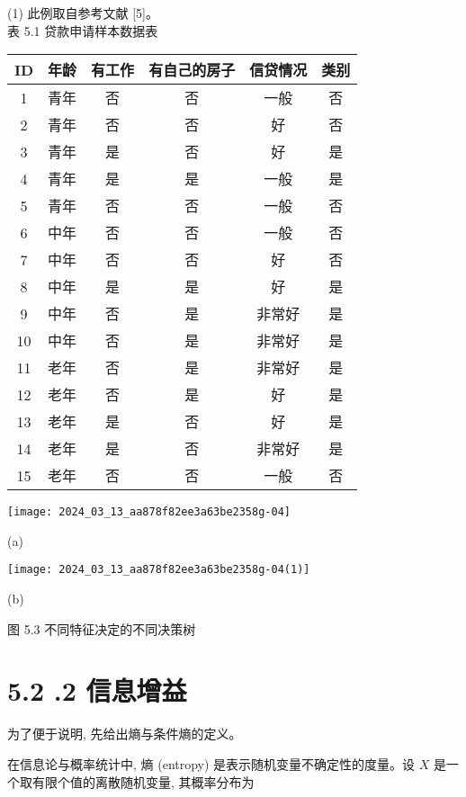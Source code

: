 \documentclass[10pt]{article}
\begin{document}
\begin{CJK*}{UTF8}{bsmi}
(1) 此例取自参考文献 [5]。\\
表 5.1 贷款申请样本数据表

\begin{center}
\begin{tabular}{cccccc}
\hline\hline
ID & 年龄 & 有工作 & 有自己的房子 & 信贷情况 & 类别 \\
\hline
1 & 青年 & 否 & 否 & 一般 & 否 \\
2 & 青年 & 否 & 否 & 好 & 否 \\
3 & 青年 & 是 & 否 & 好 & 是 \\
4 & 青年 & 是 & 是 & 一般 & 是 \\
5 & 青年 & 否 & 否 & 一般 & 否 \\
6 & 中年 & 否 & 否 & 一般 & 否 \\
7 & 中年 & 否 & 否 & 好 & 否 \\
8 & 中年 & 是 & 是 & 好 & 是 \\
9 & 中年 & 否 & 是 & 非常好 & 是 \\
10 & 中年 & 否 & 是 & 非常好 & 是 \\
11 & 老年 & 否 & 是 & 非常好 & 是 \\
12 & 老年 & 否 & 是 & 好 & 是 \\
13 & 老年 & 是 & 否 & 好 & 是 \\
14 & 老年 & 是 & 否 & 非常好 & 是 \\
15 & 老年 & 否 & 否 & 一般 & 否 \\
\hline
\end{tabular}
\end{center}

\begin{center}
\texttt{[image: 2024\_03\_13\_aa878f82ee3a63be2358g-04]}
\end{center}

(a)

\begin{center}
\texttt{[image: 2024\_03\_13\_aa878f82ee3a63be2358g-04(1)]}
\end{center}

(b)

图 5.3 不同特征决定的不同决策树

\section*{5.2 .2 信息增益}
为了便于说明, 先给出熵与条件熵的定义。

在信息论与概率统计中, 熵 (entropy) 是表示随机变量不确定性的度量。设 $X$ 是一个取有限个值的离散随机变量, 其概率分布为


\end{CJK*}
\end{document}
